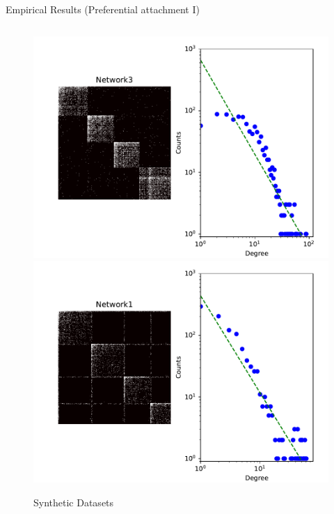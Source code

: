 \begin{frame}[c]{Empirical Results (Preferential attachment I)}

    \vspace{-0.2cm}

    \begin{columns}[t]
        \begin{column}{0.5\textwidth}
        \begin{figure}[h]
            \caption{Synthetic Datasets}
        \includegraphics[scale=0.28]{img/Network3_0.pdf}
        \includegraphics[scale=0.28]{img/Network1_0.pdf}
        \end{figure}
        \end{column}

\end{columns}
\end{frame}
